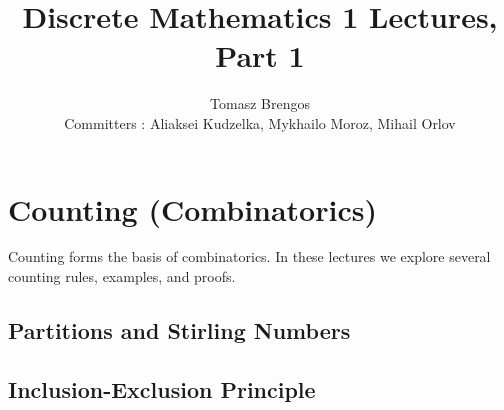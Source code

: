 \documentclass{article}
\title{Discrete Mathematics 1 Lectures, Part 1}
\author{Tomasz Brengos \\  
Committers : Aliaksei Kudzelka, Mykhailo Moroz, Mihail Orlov}
\date{}
\begin{document}
\maketitle
\cleardoublepage %

\section{Counting (Combinatorics)}

Counting forms the basis of combinatorics. In these lectures we explore several counting rules, examples, and proofs.
\begingroup
  \renewcommand{\section}{\subsection}
  
\endgroup

\section{Partitions and Stirling Numbers}
\begingroup
  \renewcommand{\section}{\subsection}
  
\endgroup

\section{Inclusion-Exclusion Principle}
\begingroup
  \let\maketitle\relax
  
\endgroup
\end{document}
